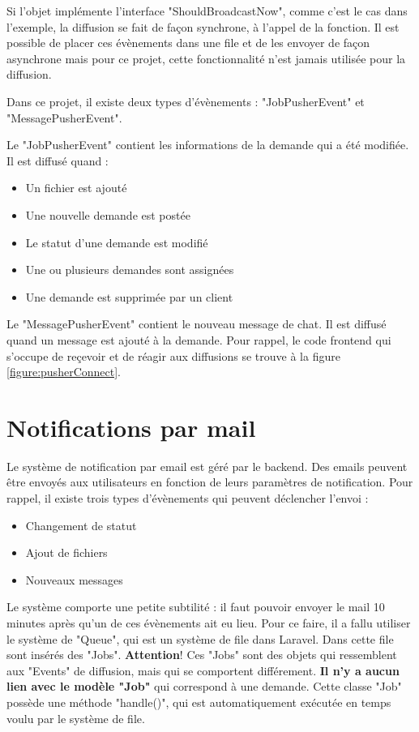 \documentclass[
    iai, %
    eai, %
]{heig-tb}
\begin{document}
Si l'objet implémente l'interface "ShouldBroadcastNow", comme c'est le cas dans l'exemple, la diffusion se fait de façon synchrone, à l'appel de la fonction. Il est possible de placer ces évènements dans une file et de les envoyer de façon asynchrone mais pour ce projet, cette fonctionnalité n'est jamais utilisée pour la diffusion.

Dans ce projet, il existe deux types d'évènements : "JobPusherEvent" et "MessagePusherEvent".

Le "JobPusherEvent" contient les informations de la demande qui a été modifiée. Il est diffusé quand :
\begin{itemize}
  \item Un fichier est ajouté
  \item Une nouvelle demande est postée
  \item Le statut d'une demande est modifié
  \item Une ou plusieurs demandes sont assignées
  \item Une demande est supprimée par un client
\end{itemize}
\bigskip

Le "MessagePusherEvent" contient le nouveau message de chat. Il est diffusé quand un message est ajouté à la demande. Pour rappel, le code frontend qui s'occupe de reçevoir et de réagir aux diffusions se trouve à la figure \ref{figure:pusherConnect}.

\newpage
\section{Notifications par mail}
Le système de notification par email est géré par le backend. Des emails peuvent être envoyés aux utilisateurs en fonction de leurs paramètres de notification.
Pour rappel, il existe trois types d'évènements qui peuvent déclencher l'envoi :
\begin{itemize}
  \item Changement de statut
  \item Ajout de fichiers
  \item Nouveaux messages
\end{itemize}
\bigskip

Le système comporte une petite subtilité : il faut pouvoir envoyer le mail 10 minutes après qu'un de ces évènements ait eu lieu. Pour ce faire, il a fallu utiliser le système de "Queue", qui est un système de file dans Laravel. Dans cette file sont insérés des "Jobs". \textbf{Attention}! Ces "Jobs" sont des objets qui ressemblent aux "Events" de diffusion, mais qui se comportent différement. \textbf{Il n'y a aucun lien avec le modèle "Job"} qui correspond à une demande. Cette classe "Job" possède une méthode "handle()", qui est automatiquement exécutée en temps voulu par le système de file.
\end{document}
